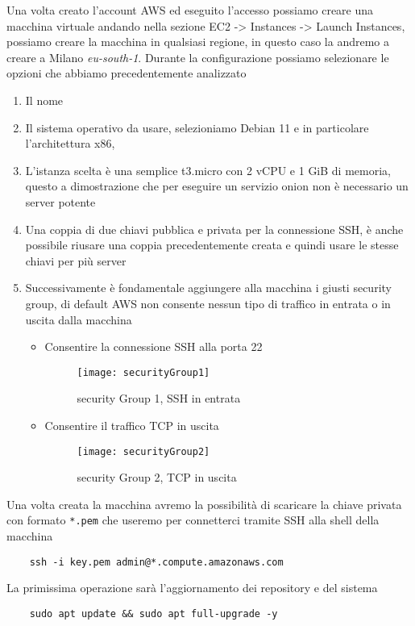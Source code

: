 Una volta creato l'account AWS ed eseguito l'accesso possiamo creare una macchina virtuale andando nella sezione EC2 -> Instances -> Launch Instances\cite{AwsLaunchInstance}, possiamo creare la macchina in qualsiasi regione, in questo caso la andremo a creare a Milano \emph{eu-south-1}. Durante la configurazione possiamo selezionare le opzioni che abbiamo precedentemente analizzato
\begin{enumerate}
    \item Il nome
    \item Il sistema operativo da usare, selezioniamo Debian 11 e in particolare l'architettura x86,
    \item L'istanza scelta è una semplice t3.micro con 2 vCPU e 1 GiB di memoria, questo a dimostrazione che per eseguire un servizio onion non è necessario un server potente
    \item Una coppia di due chiavi pubblica e privata per la connessione SSH, è anche possibile riusare una coppia precedentemente creata e quindi usare le stesse chiavi per più server
    \item Successivamente è fondamentale aggiungere alla macchina i giusti security group, di default AWS non consente nessun tipo di traffico in entrata o in uscita dalla macchina
    \begin{itemize}
        \item Consentire la connessione SSH alla porta 22
        \begin{figure}[h]
            \centering
            \texttt{[image: securityGroup1]}
            \caption{security Group 1,  SSH in entrata}
            \label{fig:sec1}
        \end{figure}
        
        \item Consentire il traffico TCP in uscita
        \begin{figure}[h]
            \centering
            \texttt{[image: securityGroup2]}
            \caption{security Group 2, TCP in uscita}
            \label{fig:sec2}
        \end{figure}
    \end{itemize}
\end{enumerate}


Una volta creata la macchina avremo la possibilità di scaricare la chiave privata con formato \lstinline{*.pem} che useremo per connetterci tramite SSH alla shell della macchina
\begin{lstlisting}
    ssh -i key.pem admin@*.compute.amazonaws.com
\end{lstlisting}
La primissima operazione sarà l'aggiornamento dei repository e del sistema
\begin{lstlisting}
    sudo apt update && sudo apt full-upgrade -y
\end{lstlisting}

